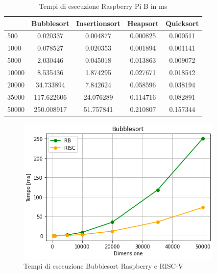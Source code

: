 \documentclass[12pt,a4paper]{report}
\begin{document}
\begin{table}[ht]
		\centering
		\begin{tabular}		{| l | c | c | c | c |}
		\hline
		      & Bubblesort & Insertionsort & Heapsort & Quicksort \\ \hline
500   & 0.020337      & 0.004877      & 0.000825 & 0.000511     \\ \hline
1000  & 0.078527	    & 0.020353      & 0.001894 & 0.001141     \\ \hline
5000  & 2.030446      & 0.045018     & 0.013863  & 0.009072   \\ \hline
10000 & 8.535436      & 1.874295     & 0.027671 & 0.018542     \\ \hline
20000 & 34.733894   & 7.842624      & 0.058596  & 0.038194   \\ \hline
35000 & 117.622606     & 24.076289     & 0.114716  & 0.082891   \\ \hline
50000 & 250.008917     & 51.757841   & 0.210807  & 0.157344  \\ \hline

		\end{tabular}
		\caption{Tempi di esecuzione Raspberry Pi B in ms}
		\label{Tab:RaspSorting}
			\end{table}

\begin{figure}[ht]
\centering
	\includegraphics[scale=0.8]{Bubblesort_RB_RISC.PNG}
	\caption{Tempi di esecuzione Bubblesort Raspberry e RISC-V}
	\label{GrafBubble}
\end{figure}
\end{document}
